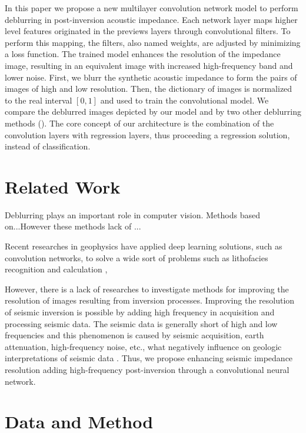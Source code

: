\documentclass[conference,compsoc]{IEEEtran}
\begin{document}
In this paper we propose a new multilayer convolution network model to perform deblurring in post-inversion acoustic impedance.
Each network layer maps higher level features originated in the previews layers through convolutional filters.
To perform this mapping, the filters, also named weights, are adjusted by minimizing a loss function. The trained model enhances the
resolution of the impedance image, resulting in an equivalent image with increased high-frequency band and lower noise.
First, we blurr the synthetic acoustic impedance to form the pairs of images of high and low resolution. Then,
the dictionary of images is normalized to the real interval $[0,1]$ and used to train the convolutional model.
We compare the deblurred images depicted by our model and by two other deblurring methods ().
The core concept of our architecture is the combination of the convolution layers with regression
layers, thus proceeding a regression solution, instead of classification.
 

\section{Related Work}
Deblurring plays an important role in computer vision.
Methods based on...However these methods lack
of ...

Recent researches in geophysics have applied deep learning solutions, such as convolution networks, to solve a wide
sort of problems such as lithofacies recognition \cite{qian} and calculation \cite{Liu}, 

However, there is a lack of researches to investigate methods for improving the resolution of
images resulting from inversion processes. Improving the resolution of seismic inversion is
possible by adding high frequency in acquisition and processing seismic data. The seismic data
is generally short of high and low frequencies and this phenomenon is caused by seismic acquisition,
earth attenuation, high-frequency noise, etc., what negatively influence on geologic interpretations of seismic data \cite{xiaoiu}.
Thus, we propose enhancing seismic impedance resolution adding high-frequency post-inversion through a convolutional
neural network.


\section{Data and Method}
\end{document}
